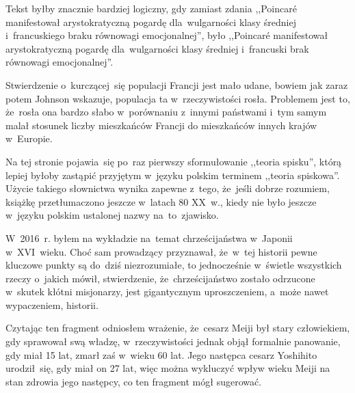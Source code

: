 \documentclass[a4paper,11pt]{article}
\begin{document}
\start {} Tekst byłby znacznie bardziej logiczny, gdy
zamiast zdania ,,Poincar\'{e} manifestował arystokratyczną pogardę
dla~wulgarności klasy średniej i~francuskiego braku równowagi
emocjonalnej'', było ,,Poincar\'{e} manifestował arystokratyczną
pogardę dla~wulgarności klasy średniej i~francuski brak równowagi
emocjonalnej''.

\vspace{\spaceFour}


\start {} Stwierdzenie o~kurczącej~się populacji Francji jest
mało udane, bowiem jak zaraz potem Johnson wskazuje, populacja ta
w~rzeczywistości rosła. Problemem jest to, że~rosła ona bardzo słabo
w~porównaniu z~innymi państwami i~tym samym malał stosunek liczby
mieszkańców Francji do mieszkańców innych krajów w~Europie.

\vspace{\spaceFour}


\start {} Na tej stronie pojawia~się po~raz pierwszy
sformułowanie ,,teoria spisku'', którą lepiej byłoby zastąpić
przyjętym w~języku polskim terminem ,,teoria spiskowa''. Użycie
takiego słownictwa wynika zapewne z~tego, że~jeśli dobrze rozumiem,
książkę przetłumaczono jeszcze w~latach 80 XX~w., kiedy nie było
jeszcze w~języku polskim ustalonej nazwy na~to~zjawisko.

\vspace{\spaceFour}


\start {}

\vspace{\spaceFour}


\start {} W~2016~r. byłem na wykładzie na~temat chrześcijaństwa
w~Japonii w~XVI~wieku. Choć sam prowadzący przyznawał, że~w~tej
historii pewne kluczowe punkty są do~dziś niezrozumiałe, to
jednocześnie w~świetle wszystkich rzeczy o~jakich mówił, stwierdzenie,
że~chrześcijaństwo zostało odrzucone w~skutek kłótni misjonarzy, jest
gigantycznym uproszczeniem, a~może nawet wypaczeniem, historii.

\vspace{\spaceFour}


\start {} Czytając ten fragment odniosłem wrażenie, że~cesarz
Meiji był stary człowiekiem, gdy sprawował swą władzę,
w~rzeczywistości jednak objął formalnie panowanie, gdy miał 15 lat,
zmarł zaś w~wieku 60 lat. Jego następca cesarz Yoshihito urodził~się,
gdy miał on 27 lat, więc można wykluczyć wpływ wieku Meiji na stan
zdrowia jego następcy, co ten fragment mógł sugerować.
\end{document}
